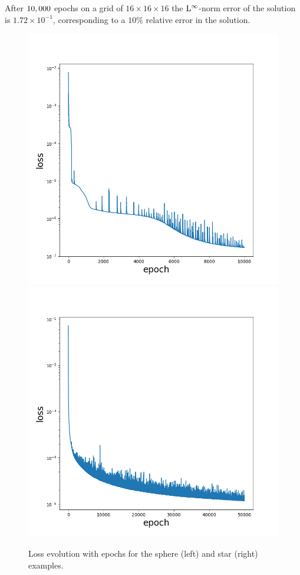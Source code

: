 \documentclass{elsarticle}
\begin{document}
After $\rm 10,000$ epochs on a grid of $16\times 16 \times 16$ the $\rm L^\infty$-norm error of the solution is $1.72\times 10^{-1}$, corresponding to a $10\%$ relative error in the solution.


\begin{figure}
	\centering
	\includegraphics[width=0.49\linewidth]{./figures/poisson_solver_loss_sphere_128x128x128.png}
	\includegraphics[width=0.49\linewidth]{./figures/poisson_solver_loss_star.png}
	\caption{Loss evolution with epochs for the sphere (left) and star (right) examples.}
	\label{fig:losses}
\end{figure}
\end{document}
